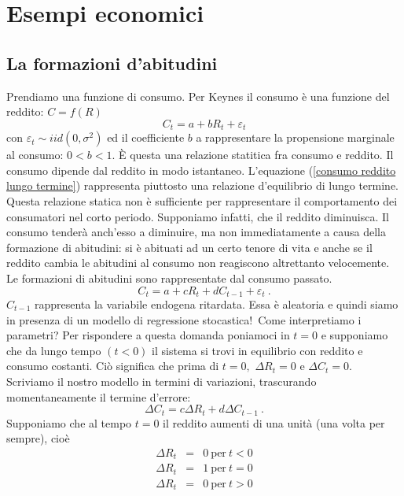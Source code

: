 \documentclass[a4paper]{report}
\newcounter{ese}
\theoremstyle{remark}
\begin{document}
\section{Esempi economici}

\subsection{La formazioni d'abitudini}

Prendiamo una funzione di consumo. Per Keynes il consumo \`{e} una funzione
del reddito: $C=f(R)$%
\begin{equation}
C_{t}=a+bR_{t}+\varepsilon _{t}  \label{consumo reddito lungo termine}
\end{equation}%
con $\varepsilon _{t}\sim iid(0,\sigma ^{2})$ ed il coefficiente $b$ a
rappresentare la propensione marginale al consumo: $0<b<1$. \`{E} questa una
relazione statitica fra consumo e reddito. Il consumo dipende dal reddito in
modo istantaneo. L'equazione (\ref{consumo reddito lungo termine})
rappresenta piuttosto una relazione d'equilibrio di lungo termine. Questa
relazione statica non \`{e} sufficiente per rappresentare il comportamento
dei consumatori nel corto periodo. Supponiamo infatti, che il reddito
diminuisca. Il consumo tender\`{a} anch'esso a diminuire, ma non
immediatamente a causa della formazione di abitudini: si \`{e} abituati ad
un certo tenore di vita e anche se il reddito cambia le abitudini al consumo
non reagiscono altrettanto velocemente. Le formazioni di abitudini sono
rappresentate dal consumo passato.%
\begin{equation*}
C_{t}=a+cR_{t}+dC_{t-1}+\varepsilon _{t}\ .
\end{equation*}%
$C_{t-1}$ rappresenta la variabile endogena ritardata. Essa \`{e} aleatoria
e quindi siamo in presenza di un modello di regressione stocastica!\ Come
interpretiamo i parametri? Per rispondere a questa domanda poniamoci in $t=0$
e supponiamo che da lungo tempo $(t<0)$ il sistema si trovi in equilibrio
con reddito e consumo costanti. Ci\`{o} significa che prima di $t=0,$ $%
\Delta R_{t}=0$ e $\Delta C_{t}=0$. Scriviamo il nostro modello in termini
di variazioni, trascurando momentaneamente il termine d'errore:%
\begin{equation*}
\Delta C_{t}=c\Delta R_{t}+d\Delta C_{t-1}\ .
\end{equation*}%
Supponiamo che al tempo $t=0$ il reddito aumenti di una unit\`{a} (una volta
per sempre), cio\`{e}%
\begin{eqnarray*}
\Delta R_{t} &=&0\ \text{per}\ t<0 \\
\Delta R_{t} &=&1\ \text{per}\ t=0 \\
\Delta R_{t} &=&0\ \text{per}\ t>0
\end{eqnarray*}%
\end{document}
